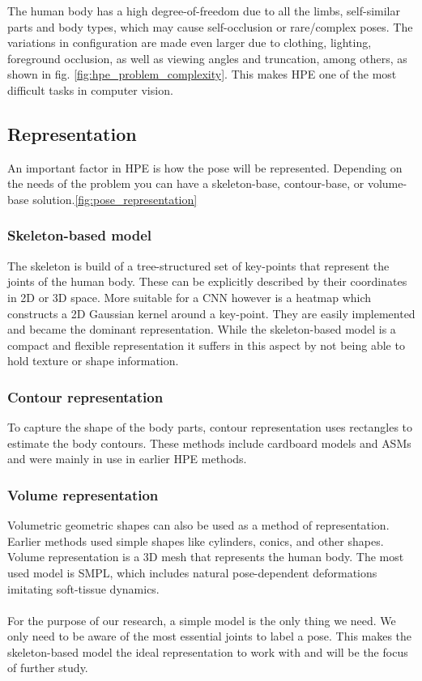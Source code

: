 The human body has a high degree-of-freedom due to all the limbs, self-similar parts and body types, which may cause self-occlusion or rare/complex poses.
The variations in configuration are made even larger due to clothing, lighting, foreground occlusion, as well as viewing angles and truncation, among others, as shown in fig. \ref{fig:hpe_problem_complexity}.
This makes \gls{HPE} one of the most difficult tasks in computer vision.\cite{jain2014}\cite{Chen2000}

\subsection{Representation}
\label{section:representation}

An important factor in \gls{HPE} is how the pose will be represented.
Depending on the needs of the problem you can have a skeleton-base, contour-base, or volume-base solution.\ref{fig:pose_representation}\cite{Chen2000}

\subsubsection{Skeleton-based model}
The skeleton is build of a tree-structured set of key-points that represent the joints of the human body.
These can be explicitly described by their coordinates in 2D or 3D space.\cite{Toshev2014}
More suitable for a \gls{CNN} however is a heatmap which constructs a 2D Gaussian kernel around a key-point.\cite{Liu2104}\cite{SWARH}
They are easily implemented and became the dominant representation.
While the skeleton-based model is a compact and flexible representation it suffers in this aspect by not being able to hold texture or shape information.\cite{Zheng2012}

\subsubsection{Contour representation}
To capture the shape of the body parts, contour representation uses rectangles to estimate the body contours.
These methods include cardboard models\cite{Ju96} and \gls{ASMs}\cite{COOTES95} and were mainly in use in earlier \gls{HPE} methods.\cite{Chen2000}

\subsubsection{Volume representation}
Volumetric geometric shapes can also be used as a method of representation.
Earlier methods used simple shapes like cylinders, conics, and other shapes.\cite{Sidenbladh2000}
Volume representation is a 3D mesh that represents the human body.
The most used model is \gls{SMPL}, which includes natural pose-dependent deformations imitating soft-tissue dynamics.\cite{Loper2015}  
\\
\\
For the purpose of our research, a simple model is the only thing we need.
We only need to be aware of the most essential joints to label a pose.
This makes the skeleton-based model the ideal representation to work with and will be the focus of further study.

